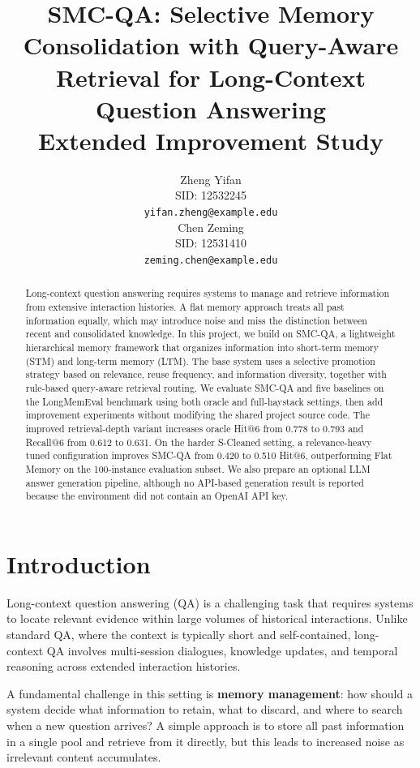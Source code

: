 \documentclass{article}
\title{SMC-QA: Selective Memory Consolidation with Query-Aware Retrieval for Long-Context Question Answering\\
\large Extended Improvement Study}
\author{
  Zheng Yifan \\
  SID: 12532245 \\
  \texttt{yifan.zheng@example.edu} \\
  \And
  Chen Zeming \\
  SID: 12531410 \\
  \texttt{zeming.chen@example.edu} \\
}
\begin{document}
\maketitle

\begin{abstract}
Long-context question answering requires systems to manage and retrieve information from extensive interaction histories. A flat memory approach treats all past information equally, which may introduce noise and miss the distinction between recent and consolidated knowledge. In this project, we build on SMC-QA, a lightweight hierarchical memory framework that organizes information into short-term memory (STM) and long-term memory (LTM). The base system uses a selective promotion strategy based on relevance, reuse frequency, and information diversity, together with rule-based query-aware retrieval routing. We evaluate SMC-QA and five baselines on the LongMemEval benchmark using both oracle and full-haystack settings, then add improvement experiments without modifying the shared project source code. The improved retrieval-depth variant increases oracle Hit@6 from 0.778 to 0.793 and Recall@6 from 0.612 to 0.631. On the harder S-Cleaned setting, a relevance-heavy tuned configuration improves SMC-QA from 0.420 to 0.510 Hit@6, outperforming Flat Memory on the 100-instance evaluation subset. We also prepare an optional LLM answer generation pipeline, although no API-based generation result is reported because the environment did not contain an OpenAI API key.
\end{abstract}

\section{Introduction}

Long-context question answering (QA) is a challenging task that requires systems to locate relevant evidence within large volumes of historical interactions. Unlike standard QA, where the context is typically short and self-contained, long-context QA involves multi-session dialogues, knowledge updates, and temporal reasoning across extended interaction histories.

A fundamental challenge in this setting is \textbf{memory management}: how should a system decide what information to retain, what to discard, and where to search when a new question arrives? A simple approach is to store all past information in a single pool and retrieve from it directly, but this leads to increased noise as irrelevant content accumulates.
\end{document}
